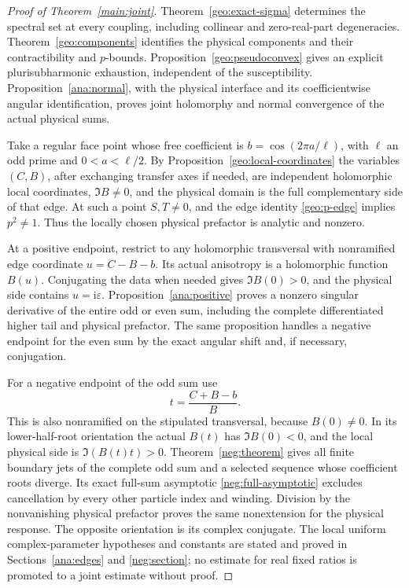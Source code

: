\documentclass[11pt]{article}
\numberwithin{equation}{section}
\theoremstyle{definition}
\newcommand{\ii}{\mathrm i}
\newcommand{\eps}{\varepsilon}
\begin{document}
\begin{proof}[Proof of Theorem~\ref{main:joint}]
Theorem~\ref{geo:exact-sigma} determines the spectral set at every
coupling, including collinear and zero-real-part degeneracies.
Theorem~\ref{geo:components} identifies the physical components
and their contractibility and \(p\)-bounds. Proposition~\ref{geo:pseudoconvex}
gives an explicit plurisubharmonic exhaustion, independent of the
susceptibility. Proposition~\ref{ana:normal}, with the physical
interface and its coefficientwise angular identification, proves
joint holomorphy and normal convergence of the actual physical sums.

Take a regular face point whose free coefficient is
\(b=\cos(2\pi a/\ell)\), with \(\ell\) an odd prime and
\(0<a<\ell/2\). By Proposition~\ref{geo:local-coordinates} the
variables \((C,B)\), after exchanging transfer axes if needed,
are independent holomorphic local coordinates, \(\Im B\ne0\),
and the physical domain is the full complementary side of that edge.
At such a point \(S,T\ne0\), and the edge identity
\eqref{geo:p-edge} implies \(p^2\ne1\). Thus the locally chosen
physical prefactor is analytic and nonzero.

At a positive endpoint, restrict to any holomorphic transversal with
nonramified edge coordinate \(u=C-B-b\). Its actual anisotropy
is a holomorphic function \(B(u)\). Conjugating the data when
needed gives \(\Im B(0)>0\), and the physical side contains
\(u=\ii\eps\). Proposition~\ref{ana:positive} proves a nonzero
singular derivative of the entire odd or even sum, including the
complete differentiated higher tail and physical prefactor. The
same proposition handles a negative endpoint for the even sum by
the exact angular shift and, if necessary, conjugation.

For a negative endpoint of the odd sum use
\[
             t=\frac{C+B-b}{B}.
\]
This is also nonramified on the stipulated transversal, because
\(B(0)\ne0\). In its lower-half-root orientation the actual
\(B(t)\) has \(\Im B(0)<0\), and the local physical side is
\(\Im(B(t)t)>0\). Theorem~\ref{neg:theorem} gives all finite
boundary jets of the complete odd sum and a selected sequence
whose coefficient roots diverge. Its exact full-sum asymptotic
\eqref{neg:full-asymptotic} excludes cancellation by every other
particle index and winding. Division by the nonvanishing physical
prefactor proves the same nonextension for the physical response.
The opposite orientation is its complex conjugate. The local uniform
complex-parameter hypotheses and constants are stated and proved in
Sections~\ref{ana:edges} and \ref{neg:section}; no estimate for
real fixed ratios is promoted to a joint estimate without proof.


\end{proof}
\end{document}
